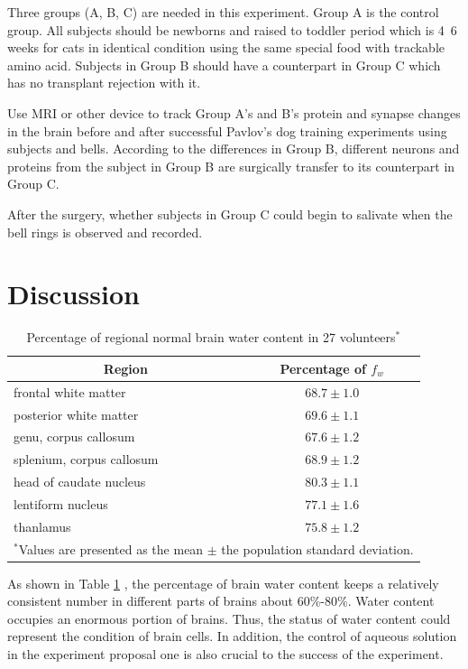 \documentclass[conference]{IEEEtran}
\begin{document}
Three groups (A, B, C) are needed in this experiment. Group A is the control group. All subjects should be newborns and raised to toddler period which is 4~6 weeks for cats in identical condition using the same special food with trackable amino acid. Subjects in Group B should have a counterpart in Group C which has no transplant rejection with it.

Use MRI or other device to track Group A's and B's protein and synapse changes in the brain before and after successful Pavlov's dog training experiments using subjects and bells. According to the differences in Group B, different neurons and proteins from the subject in Group B are surgically transfer to its counterpart in Group C. 

After the surgery, whether subjects in Group C could begin to salivate when the bell rings is observed and recorded.

\section{Discussion}

\begin{table}[htbp]
\caption{Percentage of regional normal brain water content in 27 volunteers$^{\mathrm{*}}$ \cite{b6}}
\begin{center}
\begin{tabular}{l c}
\hline\hline
\multicolumn{1}{c}{\textbf{Region}}&{\textbf{Percentage of $f_w$}} \\ 
\hline
frontal white matter & $68.7 \pm 1.0$ \\
posterior white matter & $69.6 \pm 1.1$ \\
genu, corpus callosum & $67.6 \pm 1.2$ \\
splenium, corpus callosum & $68.9 \pm 1.2$ \\
head of caudate nucleus & $80.3 \pm 1.1$ \\
lentiform nucleus & $77.1 \pm 1.6$ \\
thanlamus & $75.8 \pm 1.2$ \\
\hline
\multicolumn{2}{l}{$^{\mathrm{*}}$Values are presented as the mean $\pm$ the population standard deviation.}
\end{tabular}
\label{tab1}
\end{center}
\end{table}

As shown in Table \ref{tab1} \cite{b6}, the percentage of brain water content keeps a relatively consistent number in different parts of brains about 60\%-80\%. Water content occupies an enormous portion of brains. Thus, the status of water content could represent the condition of brain cells. In addition, the control of aqueous solution in the experiment proposal one is also crucial to the success of the experiment.
\end{document}
